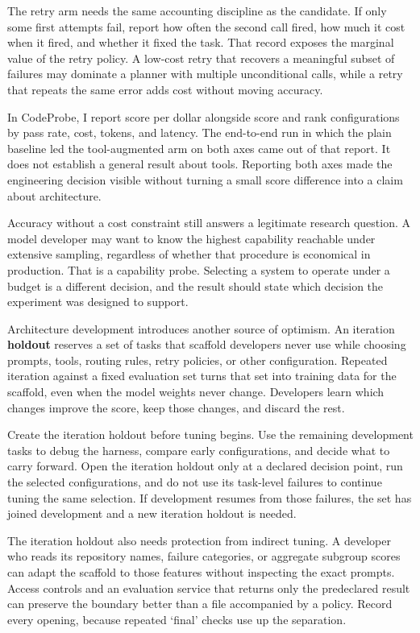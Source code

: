 The retry arm needs the same accounting discipline as the candidate. If only some first attempts fail, report how often the second call fired, how much it cost when it fired, and whether it fixed the task. That record exposes the marginal value of the retry policy. A low-cost retry that recovers a meaningful subset of failures may dominate a planner with multiple unconditional calls, while a retry that repeats the same error adds cost without moving accuracy.

In CodeProbe, I report score per dollar alongside score and rank configurations by pass rate, cost, tokens, and latency. The end-to-end run in which the plain baseline led the tool-augmented arm on both axes came out of that report. It does not establish a general result about tools. Reporting both axes made the engineering decision visible without turning a small score difference into a claim about architecture.

Accuracy without a cost constraint still answers a legitimate research question. A model developer may want to know the highest capability reachable under extensive sampling, regardless of whether that procedure is economical in production. That is a capability probe. Selecting a system to operate under a budget is a different decision, and the result should state which decision the experiment was designed to support.

Architecture development introduces another source of optimism. An iteration \textbf{holdout} reserves a set of tasks that scaffold developers never use while choosing prompts, tools, routing rules, retry policies, or other configuration. Repeated iteration against a fixed evaluation set turns that set into training data for the scaffold, even when the model weights never change. Developers learn which changes improve the score, keep those changes, and discard the rest.

Create the iteration holdout before tuning begins. Use the remaining development tasks to debug the harness, compare early configurations, and decide what to carry forward. Open the iteration holdout only at a declared decision point, run the selected configurations, and do not use its task-level failures to continue tuning the same selection. If development resumes from those failures, the set has joined development and a new iteration holdout is needed.

The iteration holdout also needs protection from indirect tuning. A developer who reads its repository names, failure categories, or aggregate subgroup scores can adapt the scaffold to those features without inspecting the exact prompts. Access controls and an evaluation service that returns only the predeclared result can preserve the boundary better than a file accompanied by a policy. Record every opening, because repeated `final' checks use up the separation.

